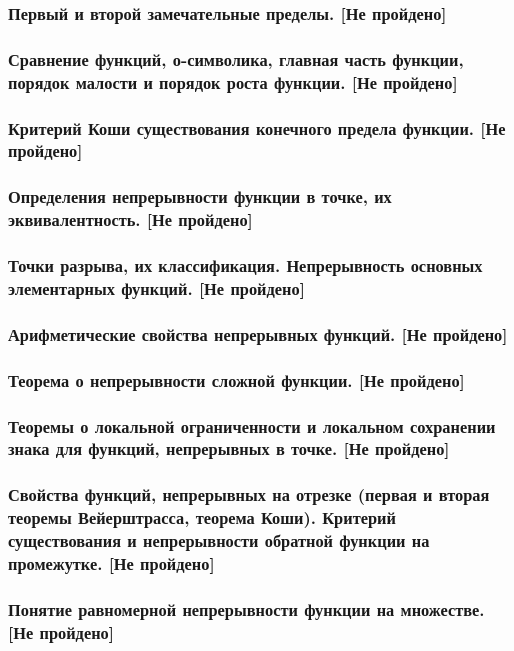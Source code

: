 \documentclass[12pt, a4paper]{article}
\begin{document}
	\subsubsection{Первый и второй замечательные пределы. [Не пройдено]} 
	\subsubsection{Сравнение функций, о-символика, главная часть функции, порядок малости и порядок роста функции. [Не пройдено]} 
	\subsubsection{Критерий Коши существования конечного предела функции. [Не пройдено]} 
	\subsubsection{Определения непрерывности функции в точке, их эквивалентность. [Не пройдено]}
	\subsubsection{Точки разрыва, их классификация. Непрерывность основных элементарных функций. [Не пройдено]} 
	\subsubsection{Арифметические свойства непрерывных функций. [Не пройдено]}
	\subsubsection{Теорема о непрерывности сложной функции. [Не пройдено]}
	\subsubsection{Теоремы о локальной ограниченности и локальном сохранении знака для функций, непрерывных в точке. [Не пройдено]} 
	\subsubsection{Свойства функций, непрерывных на отрезке (первая и вторая теоремы  Вейерштрасса, теорема Коши). Критерий существования и непрерывности обратной функции на промежутке. [Не пройдено]} 
	\subsubsection{Понятие равномерной непрерывности функции на множестве. [Не пройдено]} 
\end{document}
